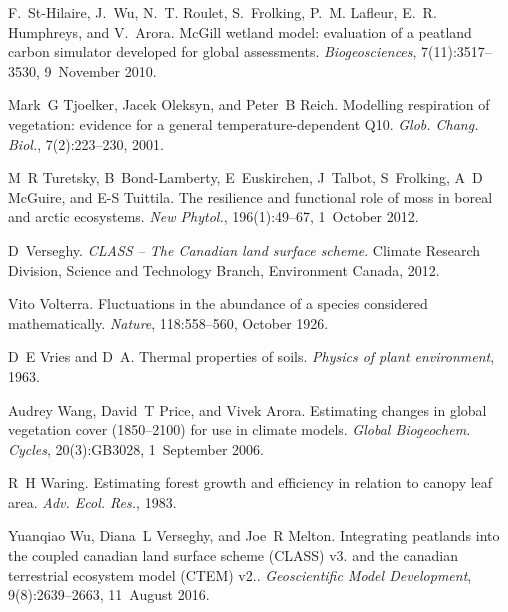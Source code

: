 \begin{DoxyDescription}
\item[\label{_CITEREF_St-Hilaire2010-5e9}%
\mbox{[}72\mbox{]}]F.~St-\/\+Hilaire, J.~Wu, N.~T. Roulet, S.~Frolking, P.~M. Lafleur, E.~R. Humphreys, and V.~Arora. Mc\+Gill wetland model\+: evaluation of a peatland carbon simulator developed for global assessments. {\itshape Biogeosciences}, 7(11)\+:3517--3530, 9~November 2010. 


\item[\label{_CITEREF_Tjoelker2001-uz}%
\mbox{[}73\mbox{]}]Mark~G Tjoelker, Jacek Oleksyn, and Peter~B Reich. Modelling respiration of vegetation\+: evidence for a general temperature-\/dependent Q10. {\itshape Glob. Chang. Biol.}, 7(2)\+:223--230, 2001.


\item[\label{_CITEREF_Turetsky2012-qh}%
\mbox{[}74\mbox{]}]M~R Turetsky, B~Bond-\/\+Lamberty, E~Euskirchen, J~Talbot, S~Frolking, A~D Mc\+Guire, and E-\/\+S Tuittila. The resilience and functional role of moss in boreal and arctic ecosystems. {\itshape New Phytol.}, 196(1)\+:49--67, 1~October 2012. 


\item[\label{_CITEREF_Verseghy2012-c0e}%
\mbox{[}75\mbox{]}]D~Verseghy. {\itshape C\+L\+A\+S\+S -- The Canadian land surface scheme}. Climate Research Division, Science and Technology Branch, Environment Canada, 2012.


\item[\label{_CITEREF_Volterra1926-iz}%
\mbox{[}76\mbox{]}]Vito Volterra. Fluctuations in the abundance of a species considered mathematically. {\itshape Nature}, 118\+:558--560, October 1926. 


\item[\label{_CITEREF_Vries1963-ti}%
\mbox{[}77\mbox{]}]D~E Vries and D~A. Thermal properties of soils. {\itshape Physics of plant environment}, 1963.


\item[\label{_CITEREF_Wang2006-he}%
\mbox{[}78\mbox{]}]Audrey Wang, David~T Price, and Vivek Arora. Estimating changes in global vegetation cover (1850–2100) for use in climate models. {\itshape Global Biogeochem. Cycles}, 20(3)\+:G\+B3028, 1~September 2006. 


\item[\label{_CITEREF_Waring1983-wc}%
\mbox{[}79\mbox{]}]R~H Waring. Estimating forest growth and efficiency in relation to canopy leaf area. {\itshape Adv. Ecol. Res.}, 1983. 


\item[\label{_CITEREF_Wu2016-zt}%
\mbox{[}80\mbox{]}]Yuanqiao Wu, Diana~L Verseghy, and Joe~R Melton. Integrating peatlands into the coupled canadian land surface scheme (C\+L\+A\+S\+S) v3. and the canadian terrestrial ecosystem model (C\+T\+E\+M) v2.. {\itshape Geoscientific Model Development}, 9(8)\+:2639--2663, 11~August 2016. 



\end{DoxyDescription}
